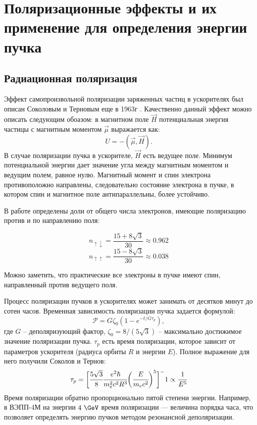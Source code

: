 \chapter{Поляризационные эффекты и их применение для определения энергии пучка}
\label{sec:respnant_dep}
\section{Радиационная поляризация}
Эффект самопроизвольной поляризации заряженных частиц в ускорителях был описан Соколовым и Терновым еще в 1963г \cite{sokolov}. Качественно данный эффект можно описать следующим обоазом: в магнитном поле $\vec{H}$ потенциальная энергия частицы с магнитным моментом  $\vec{\mu}$ выражается как: 
\begin{equation}
U = - (\vec{\mu}, \vec{H}).
\end{equation} 
В случае поляризации пучка в ускорителе, $\vec{H}$ есть ведущее поле. Минимум потенциальной энергии дает значение угла между магнитным моментом и ведущим полем, равное нулю. Магнитный момент и спин электрона противоположно направлены, следовательно состояние электрона в пучке, в котором спин и магнитное поле антипараллельны, более устойчиво.
\par В работе  \cite{sokolov} определены доли от общего числа электронов, имеющие поляризацию против и по направлению поля: 
\begin{multicols}{2}
	\noindent
	\begin{equation}
	n_{\uparrow\downarrow} = \frac{15+8\sqrt{3}}{30} \approx 0.962 
	\end{equation}
	\begin{equation}
	n_{\uparrow\uparrow} = \frac{15-8\sqrt{3}}{30} \approx 0.038
	\end{equation}
\end{multicols}%
\noindent Можно заметить, что практические все электроны в пучке имеют спин, направленный против ведущего поля.
\par Процесс поляризации пучков в ускорителях может занимать от десятков минут до сотен часов. Временная зависимость поляризации пучка задается формулой: 
\begin{equation}
	\mathcal{P} = G\zeta_0(1-e^{-t/G\tau_p}),
	\label{eq:polDepOnTime}
\end{equation}
где $G$ -- деполяризующий фактор, $\zeta_0 = 8/(5\sqrt{3})$ -- максимально достижимое значение поляризации пучка. $\tau_p$ есть время поляризации, которое зависит от параметров ускорителя (радиуса орбиты $R$ и энергии $E$). Полное выражение для него получили Соколов и Тернов:
\begin{equation}
\tau_p = \biggl[\cfrac{5 \sqrt{3}}{8} \cfrac{e^2\hbar}{m_e ^2c^2 R^3} \biggl(\cfrac{E}{m_ec^2}\biggr)^5 \biggr]^-1 \propto \cfrac{1}{E^5}
\label{eq:pol_time}
\end{equation} 
Время поляризации обратно пропорционально пятой степени энергии. Например, в ВЭПП-4М на энергии $4~\GeV$ время поляризации --- величина порядка часа, что позволяет определять энергию пучков методом резонансной деполяризации.

